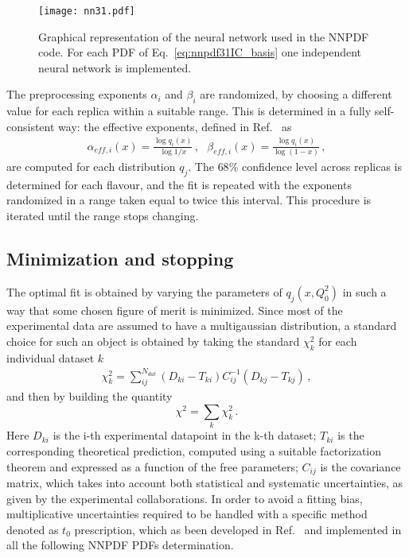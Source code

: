 \begin{figure}[htb]     
	\begin{center}
		\texttt{[image: nn31.pdf]}
	\end{center}
    \caption{Graphical representation of the neural network used in the NNPDF code.
    For each PDF of Eq.~\eqref{eq:nnpdf31IC_basis} one independent neural network is implemented.}
	\label{nn}                 
\end{figure}
The preprocessing exponents $\alpha_i$ and $\beta_i$ are randomized, by choosing a different value for each replica
within a suitable range. This is determined in a fully self-consistent way: the effective exponents, defined in
Ref.~\cite{Ball:2014uwa} as 
\begin{align}
    \label{eq:effective_exp}
    \alpha_{eff,i}\left(x\right) = \frac{\log q_i\left(x\right)}{\log 1/x}\,, \,\,\,\,
    \beta_{eff,i}\left(x\right) = \frac{\log q_i\left(x\right)}{\log\left(1-x\right)}\,,
\end{align}
are computed for each distribution $q_j$. The $68\%$ confidence level across replicas
is determined for each flavour, and the fit is repeated with the exponents randomized in a range taken equal to twice this 
interval. This procedure is iterated until the range stops changing.

\subsection{Minimization and stopping}
\label{sec:minimization}
The optimal fit is obtained by varying the parameters of $q_j\left(x,Q_0^2\right)$  in such a way that 
some chosen figure of merit is minimized. 
Since most of the experimental data are assumed to have a multigaussian
distribution, a standard choice for such an object is obtained by taking the standard $\chi^2_k $ for each individual 
dataset $k$
\begin{align}
    \label{eq:chi2}
    \chi^2_k 
    =\sum_{ij}^{N_{dat}}\left(D_{ki}-T_{ki}\right)C_{ij}^{-1}\left(D_{kj}-T_{kj}\right)\,,
\end{align}
and then by building the quantity
\begin{equation}
\label{tot chi2}
\chi^2=\sum_k \chi^2_k\,.
\end{equation}
Here $D_{ki}$ is the i-th experimental datapoint in the k-th dataset; $T_{ki}$ is the corresponding 
theoretical prediction, computed using a suitable factorization theorem and 
expressed as a function of the free parameters; 
$C_{ij}$ is the covariance matrix, which takes into account both statistical and systematic uncertainties,
as given by the experimental collaborations.
In order to avoid a fitting bias, multiplicative uncertainties required to be handled with a specific method
denoted as $t_0$ prescription, which as been developed in Ref.~\cite{Ball:2009qv} and implemented in all the following
NNPDF PDFs determination.

